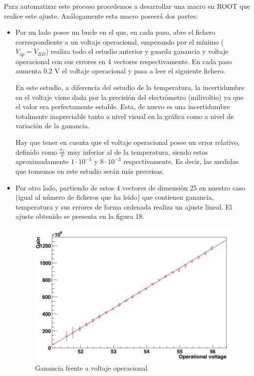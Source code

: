 Para automatizar este proceso procedemos a desarrollar una macro en ROOT que realice este ajuste. Análogamente esta macro poseerá dos partes:
\begin{itemize}
\item{} Por un lado posee un bucle en el que, en cada paso, abre el fichero correspondiente a un voltaje operacional, empezando por el mínimo ($V_{op}=V_{BD}$) realiza todo el estudio anterior y guarda ganancia y voltaje operacional con sus errores en 4 vectores respectivamente. En cada paso aumenta 0.2 V el voltaje operacional y pasa a leer el siguiente fichero. 

En este estudio, a diferencia del estudio de la temperatura, la incertidumbre en el voltaje viene dada por la precisión del electrómetro (milivoltio) ya que el valor era perfectamente estable. Esta, de nuevo es una incertidumbre totalmente inapreciable tanto a nivel visual en la gráfica como a nivel de variación de la ganancia. 

Hay que tener en cuenta que el voltaje operacional posee un error relativo, definido como $\frac{\sigma_x}{x}$ muy inferior al de la temperatura, siendo estos aproximadamente $1 \cdot 10^{-5}$ y $8 \cdot 10^{-3}$ respectivamente. Es decir, las medidas que tomemos en este estudio serán más preceisas.

\item {} Por otro lado, partiendo de estos 4 vectores de dimensión 25 en nuestro caso (igual al número de ficheros que ha leido) que contienen ganancia, temperatura y sus errores de forma ordenada realiza un ajuste lineal. El ajuste obtenido se presenta en la figura 18.

\begin{figure}[hbtp]
\centering
\includegraphics[scale=0.4]{Dependenciavoltaje.png}
\caption{ Ganancia frente a voltaje operacional\label{voltaje}}
\end{figure}


\end{itemize}
